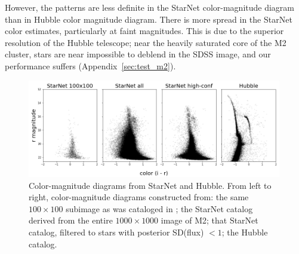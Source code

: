 However, 
the patterns are less definite in the StarNet color-magnitude diagram than in Hubble color magnitude diagram.
There is more spread in the StarNet color estimates, particularly at faint magnitudes. 
This is due to the superior resolution of the Hubble telescope; near the heavily saturated core of the M2 cluster, stars are near impossible to deblend in the SDSS image, and our performance suffers (Appendix~\ref{sec:test_m2}). 




\begin{figure}[tb]
    \centering
    \includegraphics[width=0.99\textwidth]{figures/m2_results/m2_cmd.png}
    \caption{Color-magnitude diagrams from StarNet and Hubble. From left to right, color-magnitude diagrams constructed from: the same $100\times100$ subimage as was cataloged in \cite{Feder_2019}; 
    the StarNet catalog derived from the entire $1000 \times 1000$ image of M2; 
    that StarNet catalog, filtered to stars with posterior SD(flux) $< 1$; the Hubble catalog. 
}
    \label{fig:m2_cmd}
\end{figure}



